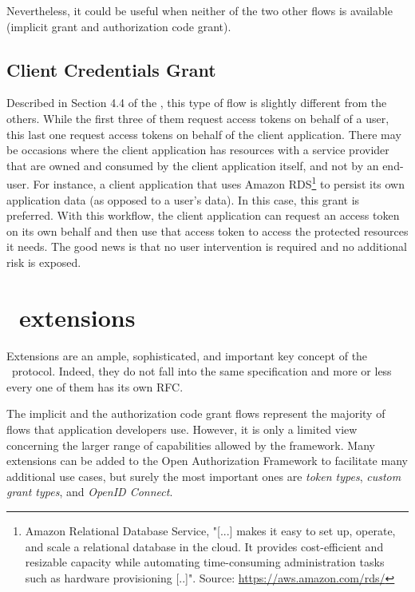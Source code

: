 Nevertheless, it could be useful when neither of the two other flows is available (implicit grant and authorization code grant).

\subsection{Client Credentials Grant}
Described in Section 4.4 of the , this type of flow is slightly different from the others. While the first three of them request access tokens on behalf of a user, this last one request access tokens on behalf of the client application. There may be occasions where the client application has resources with a service provider that are owned and consumed by the client application itself, and not by an end-user. For instance, a client application that uses Amazon RDS\footnote{Amazon Relational Database Service, "[...] makes it easy to set up, operate, and scale a relational database in the cloud. It provides cost-efficient and resizable capacity while automating time-consuming administration tasks such as hardware provisioning [..]". Source: \url{https://aws.amazon.com/rds/}} to persist its own application data (as opposed to a user's data). In this case, this grant is preferred. With this workflow, the client application can request an access token on its own behalf and then use that access token to access the protected resources it needs. The good news is that no user intervention is required and no additional risk is exposed.

\section{\oauth\ extensions}
Extensions are an ample, sophisticated, and important key concept of the \oauth\ protocol. Indeed, they do not fall into the same specification and more or less every one of them has its own RFC.

The implicit and the authorization code grant flows represent the majority of flows that application developers use. However, it is only a limited view concerning the larger range of capabilities allowed by the framework. Many extensions can be added to the Open Authorization Framework to facilitate many additional use cases, but surely the most important ones are \textit{token types}, \textit{custom grant types}, and \textit{OpenID Connect}.

